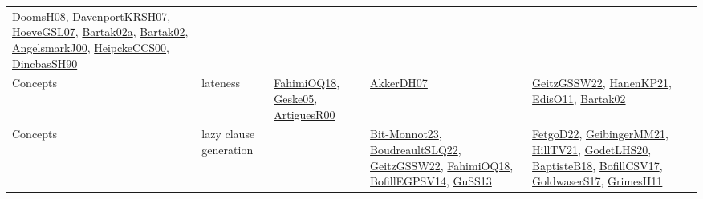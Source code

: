 {\begin{longtable}{lp{3cm}>{\raggedright}p{6cm}>{\raggedright}p{6cm}p{8cm}}
\href{papers/DoomsH08.pdf}{DoomsH08}\cite{DoomsH08}, \href{papers/DavenportKRSH07.pdf}{DavenportKRSH07}\cite{DavenportKRSH07}, \href{papers/HoeveGSL07.pdf}{HoeveGSL07}\cite{HoeveGSL07}, \href{papers/Bartak02a.pdf}{Bartak02a}\cite{Bartak02a}, \href{papers/Bartak02.pdf}{Bartak02}\cite{Bartak02}, \href{papers/AngelsmarkJ00.pdf}{AngelsmarkJ00}\cite{AngelsmarkJ00}, \href{articles/HeipckeCCS00.pdf}{HeipckeCCS00}\cite{HeipckeCCS00}, \href{articles/DincbasSH90.pdf}{DincbasSH90}\cite{DincbasSH90}\\
Concepts & lateness & \href{articles/FahimiOQ18.pdf}{FahimiOQ18}\cite{FahimiOQ18}, \href{papers/Geske05.pdf}{Geske05}\cite{Geske05}, \href{articles/ArtiguesR00.pdf}{ArtiguesR00}\cite{ArtiguesR00} & \href{papers/AkkerDH07.pdf}{AkkerDH07}\cite{AkkerDH07} & \href{papers/GeitzGSSW22.pdf}{GeitzGSSW22}\cite{GeitzGSSW22}, \href{papers/HanenKP21.pdf}{HanenKP21}\cite{HanenKP21}, \href{papers/EdisO11.pdf}{EdisO11}\cite{EdisO11}, \href{papers/Bartak02.pdf}{Bartak02}\cite{Bartak02}\\
Concepts & lazy clause generation &  & \href{papers/Bit-Monnot23.pdf}{Bit-Monnot23}\cite{Bit-Monnot23}, \href{papers/BoudreaultSLQ22.pdf}{BoudreaultSLQ22}\cite{BoudreaultSLQ22}, \href{papers/GeitzGSSW22.pdf}{GeitzGSSW22}\cite{GeitzGSSW22}, \href{articles/FahimiOQ18.pdf}{FahimiOQ18}\cite{FahimiOQ18}, \href{papers/BofillEGPSV14.pdf}{BofillEGPSV14}\cite{BofillEGPSV14}, \href{papers/GuSS13.pdf}{GuSS13}\cite{GuSS13} & \href{articles/FetgoD22.pdf}{FetgoD22}\cite{FetgoD22}, \href{papers/GeibingerMM21.pdf}{GeibingerMM21}\cite{GeibingerMM21}, \href{papers/HillTV21.pdf}{HillTV21}\cite{HillTV21}, \href{papers/GodetLHS20.pdf}{GodetLHS20}\cite{GodetLHS20}, \href{articles/BaptisteB18.pdf}{BaptisteB18}\cite{BaptisteB18}, \href{papers/BofillCSV17.pdf}{BofillCSV17}\cite{BofillCSV17}, \href{papers/GoldwaserS17.pdf}{GoldwaserS17}\cite{GoldwaserS17}, \href{papers/GrimesH11.pdf}{GrimesH11}\cite{GrimesH11}\\

\end{longtable}}
